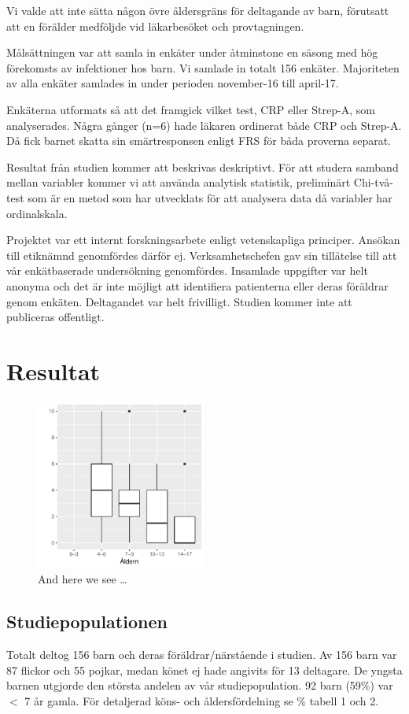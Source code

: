 \documentclass[12pt,twocolumn]{article}
\begin{document}
Vi valde att inte sätta någon övre åldersgräns för deltagande av
barn, förutsatt att en förälder medföljde vid läkarbesöket och
provtagningen.

Målsättningen var att samla in enkäter under åtminstone en säsong
med hög förekomsts av infektioner hos barn. Vi samlade in totalt 156
enkäter.
Majoriteten av alla enkäter samlades in under perioden november-16 till
april-17.

Enkäterna utformats så att det framgick vilket test, CRP eller Strep-A,
som analyserades. Några gånger (n=6) hade läkaren ordinerat både
CRP och Strep-A. Då fick barnet skatta sin smärtresponsen enligt FRS för
båda proverna separat.

Resultat från studien kommer att beskrivas deskriptivt. För att studera
samband mellan variabler kommer vi att använda analytisk statistik,
preliminärt Chi-två-test som är en metod som har utvecklats för att
analysera data då variabler har ordinalskala.

Projektet var ett internt forskningsarbete enligt vetenskapliga principer.
Ansökan till etiknämnd genomfördes därför ej. Verksamhetschefen gav
sin tillåtelse till att vår enkätbaserade undersökning
genomfördes. Insamlade uppgifter var helt anonyma och det är inte möjligt
att identifiera patienterna eller deras föräldrar genom enkäten.
Deltagandet var helt frivilligt. Studien kommer inte att publiceras offentligt.

\section{Resultat}

\begin{figure}
 \includegraphics[width=0.5\textwidth]{figures/Question_10_all}
 \caption{ And here we see \ldots }
\end{figure}

\subsection{Studiepopulationen}
Totalt deltog 156 barn och deras föräldrar/närstående i studien. Av
156 barn var 87 flickor och 55 pojkar, medan könet ej hade angivits för 13
deltagare. De yngsta barnen utgjorde den största andelen av vår
studiepopulation. 92 barn (59\%) var $<$ 7 år gamla. För detaljerad
köns- och åldersfördelning se \% tabell 1 och 2.
\end{document}
